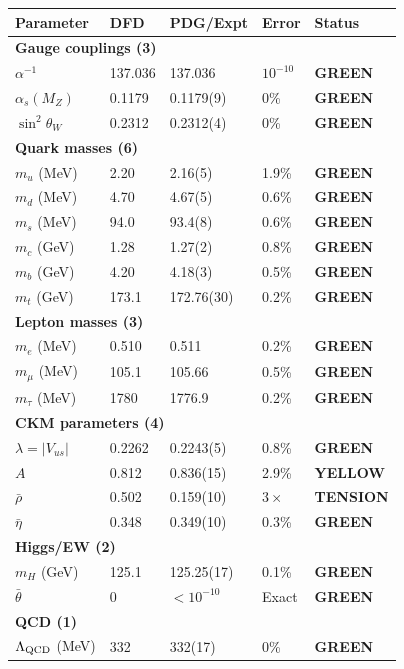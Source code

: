 \documentclass[11pt,a4paper]{article}
\theoremstyle{remark}
\newcommand{\GREEN}{\textcolor{dfdgreen}{\textbf{GREEN}}}
\newcommand{\YELLOW}{\textcolor{dfdred!70!black}{\textbf{YELLOW}}}
\begin{document}
\begin{longtable}{p{3.5cm}p{3cm}p{2.5cm}p{1.5cm}p{2cm}}
\toprule
\textbf{Parameter} & \textbf{DFD} & \textbf{PDG/Expt} & \textbf{Error} & \textbf{Status} \\
\midrule
\endhead
\multicolumn{5}{l}{\textbf{Gauge couplings (3)}} \\
\midrule
$\alpha^{-1}$ & 137.036 & 137.036 & $10^{-10}$ & \GREEN{} \\
$\alpha_s(M_Z)$ & 0.1179 & 0.1179(9) & 0\% & \GREEN{} \\
$\sin^2\theta_W$ & 0.2312 & 0.2312(4) & 0\% & \GREEN{} \\
\midrule
\multicolumn{5}{l}{\textbf{Quark masses (6)}} \\
\midrule
$m_u$ (MeV) & 2.20 & 2.16(5) & 1.9\% & \GREEN{} \\
$m_d$ (MeV) & 4.70 & 4.67(5) & 0.6\% & \GREEN{} \\
$m_s$ (MeV) & 94.0 & 93.4(8) & 0.6\% & \GREEN{} \\
$m_c$ (GeV) & 1.28 & 1.27(2) & 0.8\% & \GREEN{} \\
$m_b$ (GeV) & 4.20 & 4.18(3) & 0.5\% & \GREEN{} \\
$m_t$ (GeV) & 173.1 & 172.76(30) & 0.2\% & \GREEN{} \\
\midrule
\multicolumn{5}{l}{\textbf{Lepton masses (3)}} \\
\midrule
$m_e$ (MeV) & 0.510 & 0.511 & 0.2\% & \GREEN{} \\
$m_\mu$ (MeV) & 105.1 & 105.66 & 0.5\% & \GREEN{} \\
$m_\tau$ (MeV) & 1780 & 1776.9 & 0.2\% & \GREEN{} \\
\midrule
\multicolumn{5}{l}{\textbf{CKM parameters (4)}} \\
\midrule
$\lambda = |V_{us}|$ & 0.2262 & 0.2243(5) & 0.8\% & \GREEN{} \\
$A$ & 0.812 & 0.836(15) & 2.9\% & \YELLOW{} \\
$\bar\rho$ & 0.502 & 0.159(10) & $3\times$ & \textcolor{dfdred}{\textbf{TENSION}} \\
$\bar\eta$ & 0.348 & 0.349(10) & 0.3\% & \GREEN{} \\
\midrule
\multicolumn{5}{l}{\textbf{Higgs/EW (2)}} \\
\midrule
$m_H$ (GeV) & 125.1 & 125.25(17) & 0.1\% & \GREEN{} \\
$\bar\theta$ & 0 & $< 10^{-10}$ & Exact & \GREEN{} \\
\midrule
\multicolumn{5}{l}{\textbf{QCD (1)}} \\
\midrule
$\Lambda_{\rm QCD}$ (MeV) & 332 & 332(17) & 0\% & \GREEN{} \\
\bottomrule
\end{longtable}
\end{document}
